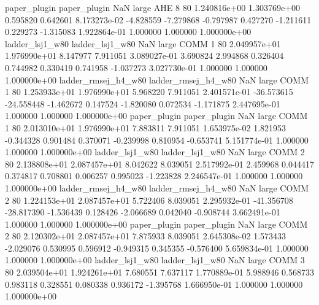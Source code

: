        paper_plugin        paper_plugin                   NaN      large      AHE                 8 80 1.240816e+00   1.303769e+00      0.595820       0.642601  8.173273e-02     -4.828559     -7.279868    -0.797987       0.427270 -1.211611   0.229273    -1.315083   1.922864e-01            1.000000        1.000000        1.000000e+00
    ladder_lsj1_w80     ladder_lsj1_w80                   NaN      large     COMM                 1 80 2.049957e+01   1.976990e+01      8.147977       7.911051  3.089027e-01      3.690824      2.994868     0.326404       0.744982  0.330419   0.741958    -1.037273   3.027730e-01            1.000000        1.000000        1.000000e+00
ladder_rmsej_h4_w80 ladder_rmsej_h4_w80                   NaN      large     COMM                 1 80 1.253933e+01   1.976990e+01      5.968220       7.911051  2.401571e-01    -36.573615    -24.558448    -1.462672       0.147524 -1.820080   0.072534    -1.171875   2.447695e-01            1.000000        1.000000        1.000000e+00
       paper_plugin        paper_plugin                   NaN      large     COMM                 1 80 2.013010e+01   1.976990e+01      7.883811       7.911051  1.653975e-02      1.821953     -0.344328     0.901484       0.370071 -0.239998   0.810954    -0.653741   5.151774e-01            1.000000        1.000000        1.000000e+00
    ladder_lsj1_w80     ladder_lsj1_w80                   NaN      large     COMM                 2 80 2.138808e+01   2.087457e+01      8.042622       8.039051  2.517992e-01      2.459968      0.044417     0.374817       0.708801  0.006257   0.995023    -1.223828   2.246547e-01            1.000000        1.000000        1.000000e+00
ladder_rmsej_h4_w80 ladder_rmsej_h4_w80                   NaN      large     COMM                 2 80 1.224153e+01   2.087457e+01      5.722406       8.039051  2.295932e-01    -41.356708    -28.817390    -1.536439       0.128426 -2.066689   0.042040    -0.908744   3.662491e-01            1.000000        1.000000        1.000000e+00
       paper_plugin        paper_plugin                   NaN      large     COMM                 2 80 2.120302e+01   2.087457e+01      7.875933       8.039051  2.645308e-02      1.573433     -2.029076     0.530995       0.596912 -0.949315   0.345355    -0.576400   5.659834e-01            1.000000        1.000000        1.000000e+00
    ladder_lsj1_w80     ladder_lsj1_w80                   NaN      large     COMM                 3 80 2.039504e+01   1.924261e+01      7.680551       7.637117  1.770889e-01      5.988946      0.568733     0.983118       0.328551  0.080338   0.936172    -1.395768   1.666950e-01            1.000000        1.000000        1.000000e+00
